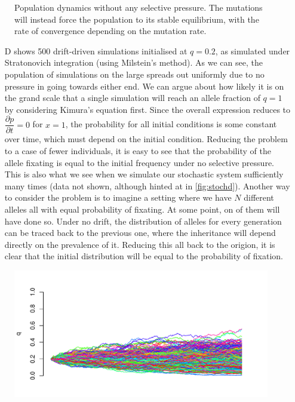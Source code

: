 \documentclass[10pt]{article}\usepackage[]{graphicx}\usepackage[]{color}
\makeatletter
\def\maxwidth{ %
  \ifdim\Gin@nat@width>\linewidth
    \linewidth
  \else
    \Gin@nat@width
  \fi
}
\theoremstyle{plain}
\makeatother
\begin{document}
\begin{multicols*}{2}
\begin{Schunk}
\begin{figure}[H]
{}

\caption[Population dynamics without any selective pressure]{Population dynamics without any selective pressure. The mutations will instead force the population to its stable equilibrium, with the rate of convergence depending on the mutation rate.}\label{fig:stochc}
\end{figure}
\end{Schunk}
\begin{enumerate}
  \item[D]  shows 500 drift-driven simulations initialised at $q = 0.2$, as simulated under Stratonovich integration (using Milstein's method). As we can see, the population of simulations on the large spreads out uniformly due to no pressure in going towards either end. We can argue about how likely it is on the grand scale that a single simulation will reach an allele fraction of $q = 1$ by considering Kimura's equation first. Since the overall expression reduces to $\dfrac{\partial p}{\partial t} = 0$ for $x = 1$, the probability for all initial conditions is some constant over time, which must depend on the initial condition. Reducing the problem to a case of fewer individuals, it is easy to see that the probability of the allele fixating is equal to the initial frequency under no selective pressure. This is also what we see when we simulate our stochastic system sufficiently many times (data not shown, although hinted at in \cref{fig:stochd}). Another way to consider the problem is to imagine a setting where we have $N$ different alleles all with equal probability of fixating. At some point, on of them will have done so. Under no drift, the distribution of alleles for every generation can be traced back to the previous one, where the inheritance will depend directly on the prevalence of it. Reducing this all back to the origion, it is clear that the initial distribution will be equal to the probability of fixation.
\end{enumerate}
\begin{Schunk}
\begin{figure}[H]

{\centering \includegraphics[width=\maxwidth]{figure/twocolumn-stochd-1} 

}
\end{figure}
\end{Schunk}
\end{multicols*}
\end{document}
